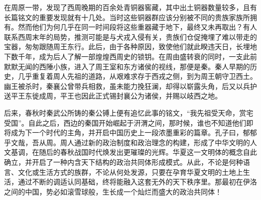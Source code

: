 在周原一带，发现了西周晚期的百余处青铜器窖藏，其中出土铜器数量较多，且有长篇铭文的重要发现就有十几处。当时这些铜器群应该分别被不同的贵族家族所拥有。然而他们为何几乎在同一时间段将这些重器藏于地下，最终又未再取出？有人联系西周末年的局势，推测可能是与犬戎入侵有关，贵族们仓促掩埋了难以带走的宝器，匆匆跟随周王东行。此后，由于各种原因，致使他们就此睽违天日，长埋地下数千年，成为后人了解一部煌煌西周史的锁钥。在周由盛转衰的同时，一支此前默默无闻的西陲小族，进入了周王室和东方诸侯的视线，那便是秦。秦人早期的历史，几乎重复着周人先祖的道路，从艰难求存于西戎之侧，到为周王朝守卫西土。幽王被杀时，秦襄公曾带兵相救，虽未能力挽狂澜，却得以崭露头角，后又以兵护送平王东徙成周，平王也因此正式锡封襄公为诸侯，并赐以岐西之地。

后来，春秋时秦武公所铸的秦公镈上便有追忆此事的铭文，“我先祖受天命，赏宅受国”。自此之后，西边的秦国开始崛起于汧渭之间，那时候，谁也不知道他们即将成为下一个时代的主角，并开启中国历史上一段浓墨重彩的篇章。孔子曰，郁郁乎文哉，吾从周。周人通过新的政治制度和政治理念的构建，形成了中华文明的人文基调，在随后的春秋战国时代焕发出更璀璨的光辉。华夏这一文明体的概念自此确立，并开启了一种内含天下结构的政治共同体形成模式。从此，不论是何种语言、文化或生活方式的族群，不论从何处发源，只要在孕育华夏文明的土地上生活，通过不断的调适认同基础，终将能融入这套无外的天下秩序里。那最初在伊洛之间的中国，势必如滚雪球般，生长成一个灿烂而盛大的政治共同体！
